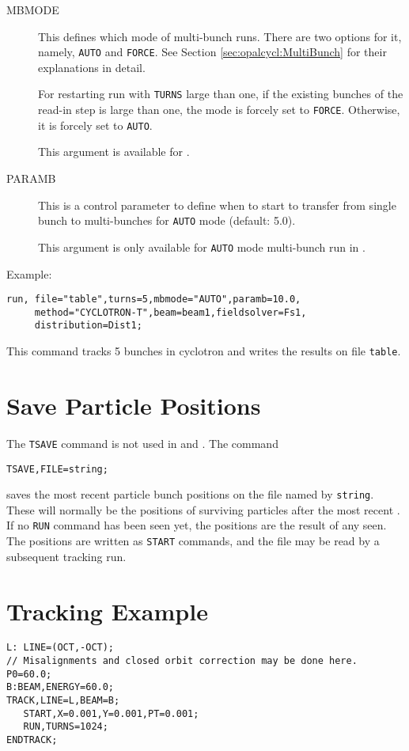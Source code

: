 \begin{description}
\item[MBMODE]
  This defines which mode of multi-bunch runs. There are two options for it, namely, \texttt{AUTO} and \texttt{FORCE}. 
  See Section \ref{sec:opalcycl:MultiBunch} for their explanations in detail.
  
  For restarting run with \texttt{TURNS} large than one, if the existing bunches of the read-in step is large than one, 
  the mode is forcely set to \texttt{FORCE}. Otherwise, it is forcely set to \texttt{AUTO}.

  This argument is available for \opalcycl.
  
\item[PARAMB]
   This is a control parameter to define when to start to transfer from single bunch to multi-bunches for \texttt{AUTO} mode (default: 5.0). 

   This argument is only available for \texttt{AUTO} mode multi-bunch run in \opalcycl.

\end{description}
Example:
\begin{verbatim}
run, file="table",turns=5,mbmode="AUTO",paramb=10.0,
     method="CYCLOTRON-T",beam=beam1,fieldsolver=Fs1,
     distribution=Dist1;
\end{verbatim}

This command tracks 5 bunches in cyclotron and writes the results on file \texttt{table}.

\section{Save Particle Positions}
\label{sec:tracksave}
The \texttt{TSAVE} command is not used in \noopalt and \noopalcycl . The command
\begin{verbatim}
TSAVE,FILE=string;
\end{verbatim}
saves the most recent particle bunch positions on the file named by 
\texttt{string}.
These will normally be the positions of surviving particles after the
most recent .
If no \texttt{RUN} command has been seen yet,
the positions are the result of any 
 seen.
The positions are written as \texttt{START} commands,
and the file may be read by a subsequent tracking run.


\section{Tracking Example}
\label{sec:trackxmpl}

\begin{verbatim}
L: LINE=(OCT,-OCT); 
// Misalignments and closed orbit correction may be done here. 
P0=60.0;
B:BEAM,ENERGY=60.0; 
TRACK,LINE=L,BEAM=B;
   START,X=0.001,Y=0.001,PT=0.001;
   RUN,TURNS=1024; 
ENDTRACK;
\end{verbatim}
